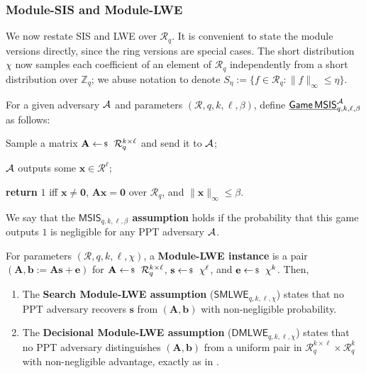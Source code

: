 \documentclass[../../book.tex]{subfiles}
\begin{document}
\subsubsection{Module-SIS and Module-LWE}

We now restate SIS and LWE over $\mathcal{R}_q$.
It is convenient to state the module versions directly, since the ring versions are special cases.
The short distribution $\chi$ now samples each coefficient of an element of $\mathcal{R}_q$ independently from a short distribution over $\mathbb{Z}_q$; 
we abuse notation to denote $S_{\eta} := \{f \in \mathcal{R}_q: \|f\|_{\infty} \leq \eta\}$.

\begin{definition}\label{def:msis}
    For a given adversary $\mathcal{A}$ and parameters $(\mathcal{R},q,k,\ell,\beta)$, define $\underline{\mathsf{Game}\,\mathsf{MSIS}}^{\mathcal{A}}_{q,k,\ell,\beta}$ as follows:
    \begin{algoen}
        \item Sample a matrix $\mathbf{A} \leftarrowS \mathcal{R}_q^{k \times \ell}$ and send it to $\mathcal{A}$;
        \item $\mathcal{A}$ outputs some $\mathbf{x} \in \mathcal{R}^{\ell}$;
        \item \textbf{return} $1$ iff $\mathbf{x} \neq \mathbf{0}$, $\mathbf{A}\mathbf{x} = \mathbf{0}$ over $\mathcal{R}_q$, and $\|\mathbf{x}\|_{\infty} \leq \beta$.
    \end{algoen}
    We say that the \textbf{$\mathsf{MSIS}_{q,k,\ell,\beta}$ assumption} holds if the probability that this game outputs $1$ is negligible for any PPT adversary $\mathcal{A}$.
\end{definition}

\begin{definition}\label{def:mlwe}
    For parameters $(\mathcal{R},q,k,\ell,\chi)$, a \textbf{Module-LWE instance} is a pair $(\mathbf{A}, \mathbf{b} := \mathbf{A}\mathbf{s}+\mathbf{e})$ for $\mathbf{A} \leftarrowS \mathcal{R}_q^{k \times \ell}$, $\mathbf{s} \leftarrowS \chi^{\ell}$, and $\mathbf{e} \leftarrowS \chi^{k}$.
    Then,
    \begin{enumerate}
        \item The \textbf{Search Module-LWE assumption} ($\mathsf{SMLWE}_{q,k,\ell,\chi}$) states that no PPT adversary recovers $\mathbf{s}$ from $(\mathbf{A},\mathbf{b})$ with non-negligible probability.
        \item The \textbf{Decisional Module-LWE assumption} ($\mathsf{DMLWE}_{q,k,\ell,\chi}$) states that no PPT adversary distinguishes $(\mathbf{A},\mathbf{b})$ from a uniform pair in $\mathcal{R}_q^{k \times \ell} \times \mathcal{R}_q^{k}$ with non-negligible advantage, exactly as in .
    \end{enumerate}
\end{definition}
\end{document}
